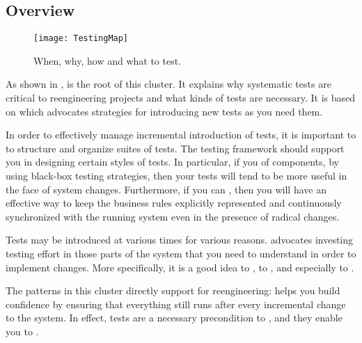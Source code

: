 \documentclass[a4paper,10pt,twoside]{book}
\begin{document}
\subsection*{Overview}

\begin{figure}
\begin{center}
\texttt{[image: TestingMap]}
\caption{When, why, how and what to test. }
\end{center}
\end{figure}

As shown in ,  is the root of this cluster. It explains why systematic tests are critical to reengineering projects and what kinds of tests are necessary. It is based on  which advocates strategies for introducing new tests as you need them.

In order to effectively manage incremental introduction of tests, it is important to  to structure and organize suites of tests. The testing framework should support you in designing certain styles of tests. In particular, if you  of components, by using black-box testing strategies, then your tests will tend to be more useful in the face of system changes. Furthermore, if you can , then you will have an effective way to keep the business rules explicitly represented and continuously synchronized with the running system even in the presence of radical changes.

Tests may be introduced at various times for various reasons.  advocates investing testing effort in those parts of the system that you need to understand in order to implement changes. More specifically, it is a good idea to , to , and especially to .

The patterns in this cluster directly support  for reengineering:  helps you build confidence by ensuring that everything still runs after every incremental change to the system. In effect, tests are a necessary precondition to , and they enable you to .
\end{document}
